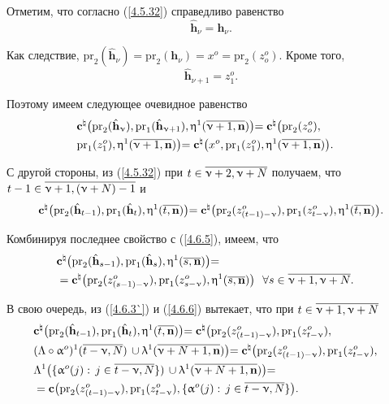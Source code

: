 Отметим, что согласно (\ref{4.5.32}) справедливо равенство
$$
  \hat{\mathbf{h}}_\nu = \mathbf{h}_\nu
  .
$$

Как следствие,
$\mathrm{pr}_2(\hat{\mathbf{h}}_\nu) = \mathrm{pr}_2(\mathbf{h}_\nu) = x^o = \mathrm{pr}_2(z_o^o).$
Кроме того,
$$
  \hat{\mathbf{h}}_{\nu+1} = z_1^o
  .
$$

Поэтому имеем следующее очевидное равенство
\begin{eqnarray}
  &\zc^\natural\bigl(\mathrm{pr}_2(\hat{\mathbf{h}}_\nu),\mathrm{pr}_1
  (\hat{\mathbf{h}}_{\nu+1}),\eta^1(\ov{\nu+1,\nn})\bigl)= \zc^\natural\bigl(\mathrm{pr}_2(z_o^o),
  &\nonumber\\
  &\mathrm{pr}_1 (z_1^o),\eta^1(\ov{\nu+1,\nn})\bigl)= \zc^\natural\bigl(x^o,\mathrm{pr}_1(z_1^o),
  \eta^1(\ov{\nu+1,\nn})\bigl)
  .
  &
  \label{4.6.5}
\end{eqnarray}

С другой стороны,
из (\ref{4.5.32}) при
$t\in\ov{\nu+2,\nu+N}$
получаем, что
$t-1 \hm \in \ov{\nu+1,(\nu+N)- 1}$ и
$$
  \zc^\natural\bigl(\mathrm{pr}_2(\hat{\mathbf{h}}_{t-1}),\mathrm{pr}_1(\hat{\mathbf{h}}_t),
  \eta^1(\ov{t,\nn})\bigl) = \zc^\natural\bigl(\mathrm{pr}_2(z_{(t-1)-\nu}^o),\mathrm{pr}_1(z_{t-\nu}^o),
  \eta^1(\ov{t,\nn})\bigl)
  .
$$

Комбинируя последнее свойство с (\ref{4.6.5}), имеем, что
\begin{eqnarray}
  &\zc^\natural\bigl(\mathrm{pr}_2(\hat{\mathbf{h}}_{s-1}),\mathrm{pr}_1
  (\hat{\mathbf{h}}_s), \eta^1(\ov{s,\nn})\bigl)=
  &\nonumber\\
  &=\zc^\natural\bigl(\mathrm{pr}_2(z_{(s-1)-\nu}^o),\mathrm{pr}_1(z_{s-\nu}^o),
  \eta^1(\ov{s,\nn})\bigl)\ \ \fa s\in \ov{\nu+1,\nu+N}
  .
  \label{4.6.6}
\end{eqnarray}

В свою очередь, из (\ref{4.6.3`}) и (\ref{4.6.6}) вытекает, что при
$t\in\ov{\nu+1,\nu+N}$
\begin{eqnarray}
  &\zc^\natural\bigl(\mathrm{pr}_2(\hat{\mathbf{h}}_{t-1}),\mathrm{pr}_1
  (\hat{\mathbf{h}}_t), \eta^1(\ov{t,\nn})\bigl)=
  \zc^\natural\bigl(\mathrm{pr}_2(z_{(t-1)-\nu}^o),\mathrm{pr}_1(z_{t-\nu}^o),
  &\nonumber\\
  &(\La \circ \al^o)^1(\ov{t-\nu,N})\,\cup
  \la^1(\ov{\nu+N+1,\nn})\bigl)=
  \zc^\natural\bigl(\mathrm{pr}_2(z_{(t-1)-\nu}^o),\mathrm{pr}_1(z_{t-\nu}^o),
  &\nonumber\\
  &\La^1\bigl(\{\al^o(j):\,j\in\ov{t-\nu,N}\})\,\cup
  \la^1(\ov{\nu+N+1,\nn})\bigl)=
  &\nonumber\\
  &=\zc\bigl(\mathrm{pr}_2(z_{(t-1)-\nu}^o),\mathrm{pr}_1(z_{t-\nu}^o),
  \{\al^o(j):\,j\in\ov{t-\nu,N}\}\bigl)
  .
  &
  \label{4.6.7}
\end{eqnarray}

